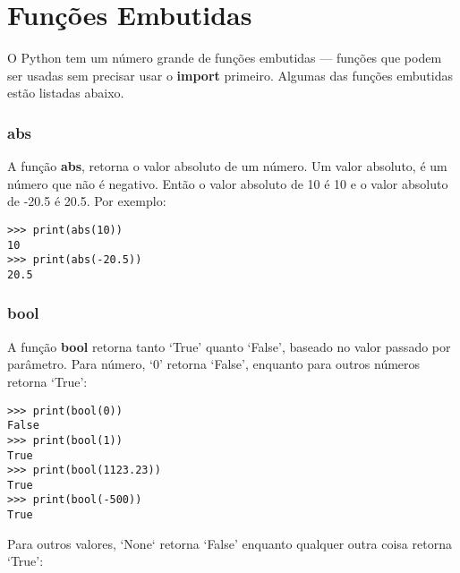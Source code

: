 

\chapter{Funções Embutidas}\label{app:builtinfunctions}

O Python tem um número grande de funções embutidas --- funções que podem ser usadas sem precisar usar o \textbf{import} primeiro. Algumas das funções embutidas estão listadas abaixo.

\subsection*{abs}

A função \textbf{abs}, retorna o valor absoluto de um número. Um valor absoluto, é um número que não é negativo. Então o valor absoluto de 10 é 10 e o valor absoluto de -20.5 é 20.5. Por exemplo:

\begin{listing}
\begin{verbatim}
>>> print(abs(10))
10
>>> print(abs(-20.5))
20.5
\end{verbatim}
\end{listing}

\subsection*{bool}

A função \textbf{bool} retorna tanto `True' quanto `False', baseado no valor passado por parâmetro. Para número, `0' retorna `False', enquanto para outros números retorna `True':

\begin{listing}
\begin{verbatim}
>>> print(bool(0))
False
>>> print(bool(1))
True
>>> print(bool(1123.23))
True
>>> print(bool(-500))
True
\end{verbatim}
\end{listing}

Para outros valores, `None` retorna `False' enquanto qualquer outra coisa retorna `True':

